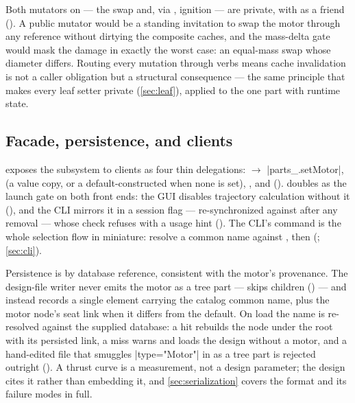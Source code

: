 \begin{rejected}
Both mutators on  --- the swap and, via , ignition --- are private, with
 as a friend (). A public mutator would be a
standing invitation to swap the motor through any  reference without dirtying the
composite caches, and the mass-delta gate would mask the damage in exactly the worst case: an
equal-mass swap whose diameter differs. Routing every mutation through  verbs
means cache invalidation is not a caller obligation but a structural consequence --- the same
principle that makes every leaf setter private (\cref{sec:leaf}), applied to the one part with
runtime state.
\end{rejected}

\subsection{Facade, persistence, and clients}\label{sec:motor-facade}

 exposes the subsystem to clients as four thin delegations: 
$\to$ \cppinline|parts_.setMotor|,  (a value copy, or a default-constructed
 when none is set), , and 
().  doubles as the launch gate on both
front ends: the GUI disables trajectory calculation without it
(), and the CLI mirrors it in a session flag --- re-synchronized
against  after any removal --- whose  check refuses with a usage
hint (). The CLI's  command is the whole selection flow in
miniature: resolve a common name against , then
 (; \cref{sec:cli}).

Persistence is by database reference, consistent with the motor's provenance. The design-file
writer never emits the motor as a tree part ---  skips  children
() --- and instead records a single element carrying the
catalog common name, plus the motor node's seat link when it differs from the default. On load the
name is re-resolved against the supplied database: a hit rebuilds the  node under the
root with its persisted link, a miss warns and loads the design without a motor, and a hand-edited
file that smuggles \cppinline|type="Motor"| in as a tree part is rejected outright
(). A thrust curve is a measurement, not a design
parameter; the design cites it rather than embedding it, and \cref{sec:serialization} covers the
format and its failure modes in full.

